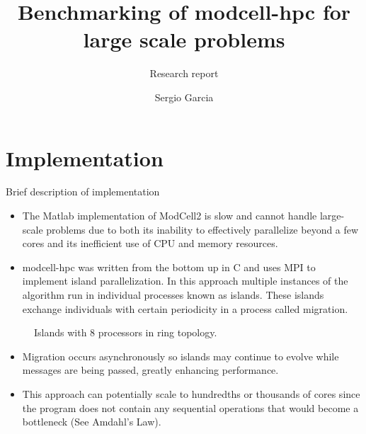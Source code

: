 \documentclass[8pt]{beamer}
\title{Benchmarking of modcell-hpc for large scale problems}
\subtitle{Research report}
\author{Sergio Garcia}
\begin{document}
\begin{frame}
\titlepage
\end{frame}

\section{Implementation}
\begin{frame}{Brief description of implementation}

        \begin{itemize}
            \item The Matlab implementation of ModCell2 is slow and cannot handle large-scale problems due to both its inability to effectively parallelize beyond a few cores and its inefficient use of CPU and memory resources.
                \item modcell-hpc was written from the bottom up in C and uses MPI to implement island parallelization. In this approach multiple instances of the algorithm run in individual processes known as islands. These islands exchange individuals with certain periodicity in a process called migration.
    \end{itemize}

\begin{figure}[H]
    \centering

\tikzset{font=\large}
    \caption{Islands with 8 processors in ring topology.}
\end{figure}

        \begin{itemize}
                \item Migration occurs asynchronously so islands may continue to evolve while messages are being passed, greatly enhancing performance.
                \item This approach can potentially scale to hundredths or thousands of cores since the program does not contain any sequential operations that would become a bottleneck (See Amdahl's Law).
    \end{itemize}

\end{frame}
\end{document}
